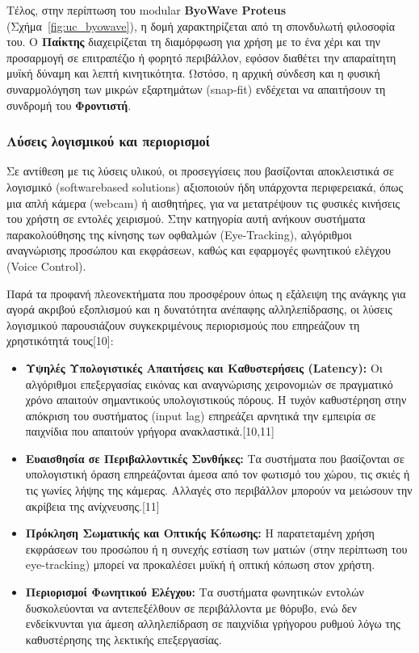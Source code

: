 \documentclass[twoside, a4paper, 11pt]{article}
\begin{document}
Τέλος, στην περίπτωση του modular \textbf{ByoWave Proteus} (Σχήμα~\ref{fig:uc_byowave}), η δομή χαρακτηρίζεται από τη σπονδυλωτή φιλοσοφία του. Ο \textbf{Παίκτης} διαχειρίζεται τη διαμόρφωση για χρήση με το ένα χέρι και την προσαρμογή σε επιτραπέζιο ή φορητό περιβάλλον, εφόσον διαθέτει την απαραίτητη μυϊκή δύναμη και λεπτή κινητικότητα. Ωστόσο, η αρχική σύνδεση και η φυσική συναρμολόγηση των μικρών εξαρτημάτων (snap-fit) ενδέχεται να απαιτήσουν τη συνδρομή του \textbf{Φροντιστή}.

\raggedbottom
\subsubsection{Λύσεις λογισμικού και περιορισμοί}
Σε αντίθεση με τις λύσεις υλικού, οι προσεγγίσεις που βασίζονται αποκλειστικά σε λογισμικό (softwarebased solutions) αξιοποιούν ήδη υπάρχοντα περιφερειακά, όπως μια απλή κάμερα (webcam) ή αισθητήρες, για να μετατρέψουν τις φυσικές κινήσεις του χρήστη σε εντολές χειρισμού. Στην κατηγορία αυτή
ανήκουν συστήματα παρακολούθησης της κίνησης των οφθαλμών (Eye-Tracking), αλγόριθμοι αναγνώρισης προσώπου και εκφράσεων, καθώς και εφαρμογές φωνητικού ελέγχου (Voice Control).

Παρά τα προφανή πλεονεκτήματα που προσφέρουν όπως η εξάλειψη της ανάγκης για αγορά ακριβού εξοπλισμού και η δυνατότητα ανέπαφης αλληλεπίδρασης, οι λύσεις λογισμικού παρουσιάζουν συγκεκριμένους περιορισμούς που επηρεάζουν τη χρηστικότητά τους[10]:
\begin{itemize}
    \item \textbf{Υψηλές Υπολογιστικές Απαιτήσεις και Καθυστερήσεις (Latency):} Οι αλγόριθμοι επεξεργασίας εικόνας και αναγνώρισης χειρονομιών σε πραγματικό χρόνο απαιτούν σημαντικούς υπολογιστικούς πόρους. Η τυχόν καθυστέρηση στην απόκριση του συστήματος (input lag) επηρεάζει αρνητικά την εμπειρία σε παιχνίδια που απαιτούν γρήγορα ανακλαστικά.[10,11]
    \item \textbf{Ευαισθησία σε Περιβαλλοντικές Συνθήκες:} Τα συστήματα που βασίζονται σε υπολογιστική όραση επηρεάζονται άμεσα από τον φωτισμό του χώρου, τις σκιές ή τις γωνίες λήψης της κάμερας. Αλλαγές στο περιβάλλον μπορούν να μειώσουν την ακρίβεια της ανίχνευσης.[11]
    \item \textbf{Πρόκληση Σωματικής και Οπτικής Κόπωσης:} Η παρατεταμένη χρήση εκφράσεων του προσώπου ή η συνεχής εστίαση των ματιών (στην περίπτωση του eye-tracking) μπορεί να προκαλέσει μυϊκή ή οπτική κόπωση στον χρήστη.
    \item \textbf{Περιορισμοί Φωνητικού Ελέγχου:} Τα συστήματα φωνητικών εντολών δυσκολεύονται να αντεπεξέλθουν σε περιβάλλοντα με θόρυβο, ενώ δεν ενδείκνυνται για άμεση αλληλεπίδραση σε παιχνίδια γρήγορου ρυθμού λόγω της καθυστέρησης της λεκτικής επεξεργασίας.
\end{itemize}
\end{document}
